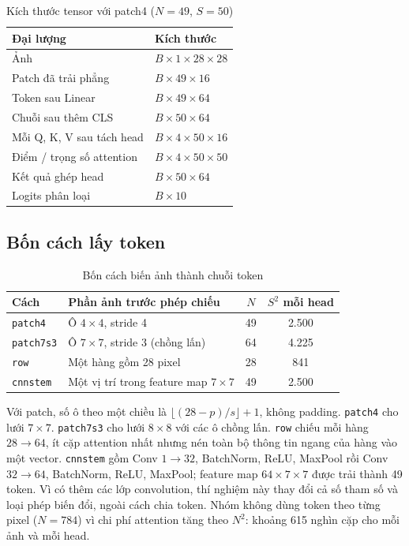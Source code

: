 \documentclass[12pt,a4paper]{article}
\begin{document}
\begin{table}[H]
\centering
\caption{Kích thước tensor với patch4 ($N=49$, $S=50$)}
\begin{tabular}{ll}
\toprule
Đại lượng & Kích thước \\
\midrule
Ảnh & $B \times 1 \times 28 \times 28$ \\
Patch đã trải phẳng & $B \times 49 \times 16$ \\
Token sau Linear & $B \times 49 \times 64$ \\
Chuỗi sau thêm CLS & $B \times 50 \times 64$ \\
Mỗi Q, K, V sau tách head & $B \times 4 \times 50 \times 16$ \\
Điểm / trọng số attention & $B \times 4 \times 50 \times 50$ \\
Kết quả ghép head & $B \times 50 \times 64$ \\
Logits phân loại & $B \times 10$ \\
\bottomrule
\end{tabular}
\end{table}

\subsection{Bốn cách lấy token}

\begin{table}[H]
\centering
\caption{Bốn cách biến ảnh thành chuỗi token}
\label{tab:tokenizers}
\begin{tabular}{llcc}
\toprule
Cách & Phần ảnh trước phép chiếu & $N$ & $S^2$ mỗi head \\
\midrule
\texttt{patch4} & Ô $4{\times}4$, stride 4 & 49 & 2.500 \\
\texttt{patch7s3} & Ô $7{\times}7$, stride 3 (chồng lấn) & 64 & 4.225 \\
\texttt{row} & Một hàng gồm 28 pixel & 28 & 841 \\
\texttt{cnnstem} & Một vị trí trong feature map $7{\times}7$ & 49 & 2.500 \\
\bottomrule
\end{tabular}
\end{table}

Với patch, số ô theo một chiều là $\lfloor(28-p)/s\rfloor + 1$, không padding.
\texttt{patch4} cho lưới $7{\times}7$. \texttt{patch7s3} cho lưới $8{\times}8$
với các ô chồng lấn. \texttt{row} chiếu mỗi hàng $28 \to 64$, ít cặp attention
nhất nhưng nén toàn bộ thông tin ngang của hàng vào một vector. \texttt{cnnstem}
gồm Conv $1 \to 32$, BatchNorm, ReLU, MaxPool rồi Conv $32 \to 64$, BatchNorm,
ReLU, MaxPool; feature map $64{\times}7{\times}7$ được trải thành 49 token. Vì
có thêm các lớp convolution, thí nghiệm này thay đổi cả số tham số và loại
phép biến đổi, ngoài cách chia token. Nhóm không dùng token theo từng pixel
($N=784$) vì chi phí attention tăng theo $N^2$: khoảng 615 nghìn cặp cho mỗi
ảnh và mỗi head.
\end{document}
